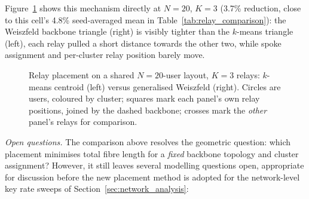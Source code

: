 \documentclass[12pt]{article}
\begin{document}
Figure~\ref{fig:relay_placement_comparison} shows this mechanism directly at $N=20$, $K=3$ (3.7\% reduction, close to this cell's 4.8\% seed-averaged mean in Table~\ref{tab:relay_comparison}): the Weiszfeld backbone triangle (right) is visibly tighter than the $k$-means triangle (left), each relay pulled a short distance towards the other two, while spoke assignment and per-cluster relay position barely move.

\begin{figure}[hbtp]
    \centering
    \resizebox{\textwidth}{!}{}
    \caption{Relay placement on a shared $N=20$-user layout, $K=3$ relays: $k$-means centroid (left) versus generalised Weiszfeld (right). Circles are users, coloured by cluster; squares mark each panel's own relay positions, joined by the dashed backbone; crosses mark the \emph{other} panel's relays for comparison.}
    \label{fig:relay_placement_comparison}
\end{figure}

\textit{Open questions.} The comparison above resolves the geometric question: which placement minimises total fibre length for a \emph{fixed} backbone topology and cluster assignment? However, it still leaves several modelling questions open, appropriate for discussion before the new placement method is adopted for the network-level key rate sweeps of Section~\ref{sec:network_analysis}:
\end{document}
